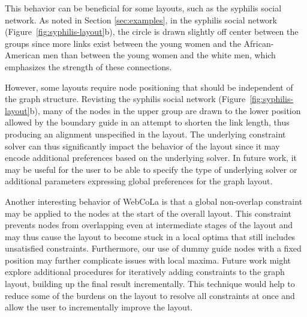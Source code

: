 This behavior can be beneficial for some layouts, such as the syphilis social network.
As noted in Section \ref{sec:examples}, in the syphilis social network
(Figure~\ref{fig:syphilis-layout}b), the circle is drawn slightly off
center between the groups since more links exist between the
young women and the African-American men than between the young women and
the white men, which emphasizes the strength of these
connections.

However, some layouts require node positioning that should be
independent of the graph structure. Revisting the syphilis social network
(Figure~\ref{fig:syphilis-layout}b), many of the nodes in the upper group
are drawn to the lower position allowed by the boundary guide in an attempt
to shorten the link length, thus producing an alignment unspecified in the
layout. The underlying constraint solver can thus significantly impact the
behavior of the layout since it may encode additional preferences based on
the underlying solver. In future work, it may be useful for the user to be able
to specify the type of underlying solver or additional parameters expressing
global preferences for the graph layout.

Another interesting behavior of WebCoLa is that a global non-overlap constraint
may be applied to the nodes at the start of the overall layout. This constraint
prevents nodes from overlapping even at intermediate stages of the layout and
may thus cause the layout to become stuck in a local optima that still
includes unsatisfied constraints. Furthermore, our use of
dummy guide nodes with a fixed position may further complicate issues
with local maxima. Future work might explore additional procedures for
iteratively adding constraints to the graph layout, building up the final
result incrementally. This technique would help to reduce some of the burdens
on the layout to resolve all constraints at once and allow the user to
incrementally improve the layout.
